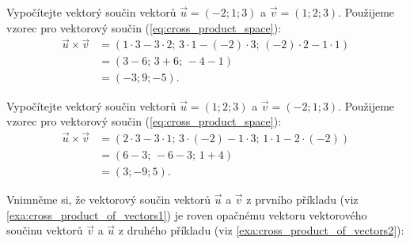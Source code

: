 \begin{example}\label{exa:cross_product_of_vectors1}
    Vypočítejte vektorý součin vektorů $\vec{u} = (-2;1;3)$ a $\vec{v} = (1;2;3)$.
    Použijeme vzorec pro vektorový součin (\ref{eq:cross_product_space}):
    \begin{align*}
        \vec{u} \times \vec{v} &= (1 \cdot 3 - 3 \cdot 2;\, 3 \cdot 1 - (-2) \cdot 3;\, (-2) \cdot 2 - 1 \cdot 1)\\
                                &= (3 - 6;\, 3 + 6;\, -4 - 1)\\
                                &= (-3; 9; -5).
    \end{align*}
\end{example}

\begin{example}\label{exa:cross_product_of_vectors2}
    Vypočítejte vektorý součin vektorů $\vec{u} = (1;2;3)$ a $\vec{v} = (-2;1;3) $.
    Použijeme vzorec pro vektorový součin (\ref{eq:cross_product_space}):
    \begin{align*}
        \vec{u} \times \vec{v} &= (2 \cdot 3 - 3 \cdot 1;\, 3 \cdot (-2) - 1 \cdot 3;\, 1 \cdot 1 - 2 \cdot (-2))\\
                                &= (6 - 3;\, -6 - 3;\, 1 + 4)\\
                                &= (3; -9; 5).
    \end{align*}
\end{example}

Vnimněme si, že vektorový součin vektorů $\vec{u}$ a $\vec{v}$ z prvního příkladu (viz \ref{exa:cross_product_of_vectors1}) je roven opačnému vektoru vektorového součinu vektorů $\vec{v}$ a $\vec{u}$ z druhého příkladu (viz \ref{exa:cross_product_of_vectors2}):

